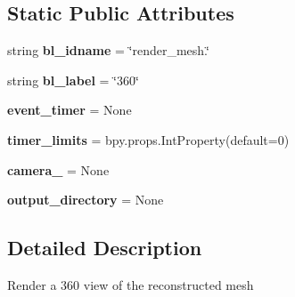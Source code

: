 \subsection*{Static Public Attributes}
\begin{DoxyCompactItemize}
\item 
string {\bfseries bl\+\_\+idname} = \char`\"{}render\+\_\+mesh.\char`\"{}\hypertarget{classui__mesh__panel_1_1RenderMesh360_a72feb2ff902e9d760b28dd69dcabf5e1}{}\label{classui__mesh__panel_1_1RenderMesh360_a72feb2ff902e9d760b28dd69dcabf5e1}

\item 
string {\bfseries bl\+\_\+label} = \char`\"{}360\char`\"{}\hypertarget{classui__mesh__panel_1_1RenderMesh360_aef3baa0b659f44d7311983e722ae51d9}{}\label{classui__mesh__panel_1_1RenderMesh360_aef3baa0b659f44d7311983e722ae51d9}

\item 
{\bfseries event\+\_\+timer} = None\hypertarget{classui__mesh__panel_1_1RenderMesh360_acf91b633efb427363ba5beca3fdac0d0}{}\label{classui__mesh__panel_1_1RenderMesh360_acf91b633efb427363ba5beca3fdac0d0}

\item 
{\bfseries timer\+\_\+limits} = bpy.\+props.\+Int\+Property(default=0)\hypertarget{classui__mesh__panel_1_1RenderMesh360_a922e69b7da545adc646e4c809dfaeaf9}{}\label{classui__mesh__panel_1_1RenderMesh360_a922e69b7da545adc646e4c809dfaeaf9}

\item 
{\bfseries camera\+\_} = None\hypertarget{classui__mesh__panel_1_1RenderMesh360_a9d9a1f3eb7f9a3161dff2f22e40a3f58}{}\label{classui__mesh__panel_1_1RenderMesh360_a9d9a1f3eb7f9a3161dff2f22e40a3f58}

\item 
{\bfseries output\+\_\+directory} = None\hypertarget{classui__mesh__panel_1_1RenderMesh360_a543706ba087294e7ac923408b70dfef1}{}\label{classui__mesh__panel_1_1RenderMesh360_a543706ba087294e7ac923408b70dfef1}

\end{DoxyCompactItemize}


\subsection{Detailed Description}
\begin{DoxyVerb}Render a 360 view of the reconstructed mesh\end{DoxyVerb}
 

